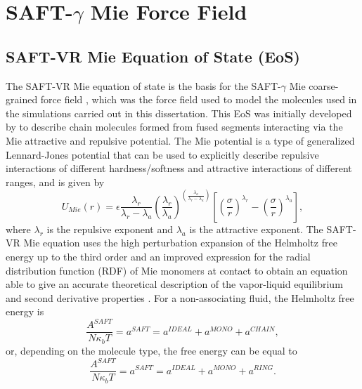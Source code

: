 \section{SAFT-$\gamma$ Mie Force Field}


\subsection{SAFT-VR Mie Equation of State (EoS)}

The SAFT-VR Mie equation of state \cite{lafitte2013} is the basis for the SAFT-$\gamma$ Mie coarse-grained force field \cite{avendano2011}, which was the force field used to model the molecules used in the simulations carried out in this dissertation. This EoS was initially developed by  to describe chain molecules formed from fused segments interacting via the Mie attractive and repulsive potential. The Mie potential is a type of generalized Lennard-Jones potential that can be used to explicitly describe repulsive interactions of different hardness/softness and attractive interactions of different ranges, and is given by
\begin{equation}
U_{Mie}(r) = \epsilon\frac{\lambda_r}{\lambda_r - \lambda_a} \left(\frac{\lambda_r}{\lambda_a} \right)^{\left( \frac{\lambda_a}{\lambda_r - \lambda_a} \right)}
\left[ \left(\frac{\sigma}{r} \right)^{\lambda_r} - \left(\frac{\sigma}{r} \right)^{\lambda_a} \right],
\label{eqn:miepotential}
\end{equation}
where $\lambda_r$ is the repulsive exponent and $\lambda_a$ is the attractive exponent. The SAFT-VR Mie equation uses the  high perturbation expansion of the Helmholtz free energy up to the third order and an improved expression for the  radial distribution function (RDF) of Mie monomers at contact to obtain an equation able to give an accurate theoretical description of the vapor-liquid equilibrium and second derivative properties \cite{lafitte2013}. For a non-associating fluid, the Helmholtz free energy is
\begin{equation}
\frac{A^{SAFT}}{N\kappa_{b}T} = a^{SAFT} = a^{IDEAL} + a^{MONO} + a^{CHAIN}, 
\label{eqn:miehelm}
\end{equation}
or, depending on the molecule type, the free energy can be equal to
\begin{equation}
\frac{A^{SAFT}}{N\kappa_{b}T} = a^{SAFT} = a^{IDEAL} + a^{MONO} + a^{RING}.
\label{eqn:miehelmring}
\end{equation}

